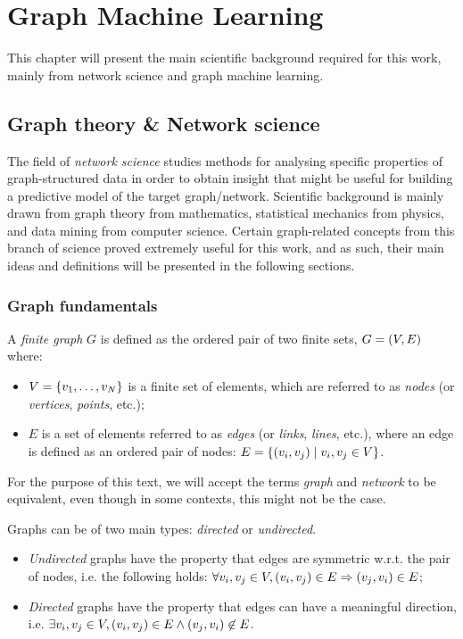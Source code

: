 \chapter{Graph Machine Learning}
\label{chp: background}


This chapter will present the main scientific background required for this work, mainly from network science and graph machine learning.

\section{Graph theory \& Network science}
The field of \emph{network science} studies methods for analysing specific properties of graph-structured data in order to obtain insight that might be useful for building a predictive model of the target graph/network. Scientific background is mainly drawn from graph theory from mathematics, statistical mechanics from physics, and data mining from computer science. Certain graph-related concepts from this branch of science proved extremely useful for this work, and as such, their main ideas and definitions will be presented in the following sections.

\subsection{Graph fundamentals}
\begin{definition}
A \emph{finite graph} $G$ is defined as the ordered pair of two finite sets, $G=\mathopen{}\left(V,E\right)$ where:
\begin{itemize}
\item $V=\mathopen{}\left\{v_1, \dots, v_N\right\}$ is a finite set of elements, which are referred to as \emph{nodes} (or \emph{vertices}, \emph{points}, etc.);
\item $E$ is a set of elements referred to as \emph{edges} (or \emph{links}, \emph{lines}, etc.), where an edge is defined as an ordered pair of nodes: $E=\mathopen{}\left\{\mathopen{}\left(v_i,v_j\right)\mid v_i,v_j \in V\right\}$.
\end{itemize}
\end{definition}
For the purpose of this text, we will accept the terms \emph{graph} and \emph{network} to be equivalent, even though in some contexts, this might not be the case.

\begin{definition}
Graphs can be of two main types: \emph{directed} or \emph{undirected}.
\begin{itemize}
\item \emph{Undirected} graphs have the property that edges are symmetric w.r.t. the pair of nodes, i.e. the following holds: $\forall v_i,v_j \in V, \mathopen{}\left(v_i,v_j\right) \in E \Rightarrow \mathopen{}\left(v_j, v_i\right) \in E$;
\item \emph{Directed} graphs have the property that edges can have a meaningful direction, i.e. $\exists v_i,v_j \in V, \mathopen{}\left(v_i,v_j\right) \in E \wedge \mathopen{}\left(v_j, v_i\right) \not\in E$.
\end{itemize}
\end{definition}

